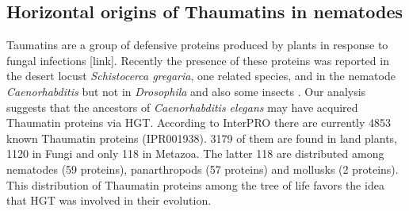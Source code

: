 \subsection{Horizontal origins of Thaumatins in nematodes} Taumatins
are a group of defensive proteins produced by plants in response to fungal
infections [link]. Recently the presence of these proteins was reported in the
desert locust \textit{Schistocerca gregaria}, one related species, and in the
nematode \textit{Caenorhabditis} but not in \textit{Drosophila} and also some
insects \cite{Brandazza2004}. Our analysis suggests that the ancestors of
\textit{Caenorhabditis elegans} may have acquired Thaumatin \cite{Vigers1992}
proteins via HGT.  According to InterPRO \cite{Finn2017} there are currently
4853 known Thaumatin proteins (IPR001938). 3179 of them are found in land
plants, 1120 in Fungi and only 118 in Metazoa. The latter 118 are distributed
among nematodes (59 proteins), panarthropods (57 proteins) and mollusks (2
proteins). This distribution of Thaumatin proteins among the tree of life
favors the idea that HGT was involved in their evolution.
